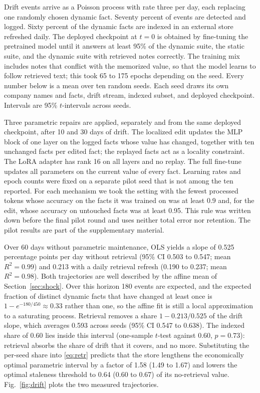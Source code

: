 \documentclass[journal]{IEEEtran}
\begin{document}
Drift events arrive as a Poisson process with rate three per day, each replacing one randomly chosen dynamic fact. Seventy percent of events are detected and logged. Sixty percent of the dynamic facts are indexed in an external store refreshed daily. The deployed checkpoint at $t=0$ is obtained by fine-tuning the pretrained model until it answers at least 95\% of the dynamic suite, the static suite, and the dynamic suite with retrieved notes correctly. The training mix includes notes that conflict with the memorized value, so that the model learns to follow retrieved text; this took 65 to 175 epochs depending on the seed. Every number below is a mean over ten random seeds. Each seed draws its own company names and facts, drift stream, indexed subset, and deployed checkpoint. Intervals are 95\% $t$-intervals across seeds.

Three parametric repairs are applied, separately and from the same deployed checkpoint, after 10 and 30 days of drift. The localized edit updates the MLP block of one layer on the logged facts whose value has changed, together with ten unchanged facts per edited fact; the replayed facts act as a locality constraint. The LoRA adapter \cite{hu2022} has rank 16 on all layers and no replay. The full fine-tune updates all parameters on the current value of every fact. Learning rates and epoch counts were fixed on a separate pilot seed that is not among the ten reported. For each mechanism we took the setting with the fewest processed tokens whose accuracy on the facts it was trained on was at least 0.9 and, for the edit, whose accuracy on untouched facts was at least 0.95. This rule was written down before the final pilot round and uses neither total error nor retention. The pilot results are part of the supplementary material.

Over 60 days without parametric maintenance, OLS yields a slope of 0.525 percentage points per day without retrieval (95\% CI 0.503 to 0.547; mean $R^2=0.99$) and 0.213 with a daily retrieval refresh (0.190 to 0.237; mean $R^2=0.98$). Both trajectories are well described by the affine mean of Section~\ref{sec:shock}. Over this horizon 180 events are expected, and the expected fraction of distinct dynamic facts that have changed at least once is $1-e^{-180/450}\approx0.33$ rather than one, so the affine fit is still a local approximation to a saturating process. Retrieval removes a share $1-0.213/0.525$ of the drift slope, which averages 0.593 across seeds (95\% CI 0.547 to 0.638). The indexed share of 0.60 lies inside this interval (one-sample $t$-test against 0.60, $p=0.73$): retrieval absorbs the share of drift that it covers, and no more. Substituting the per-seed share into \eqref{eq:retr} predicts that the store lengthens the economically optimal parametric interval by a factor of 1.58 (1.49 to 1.67) and lowers the optimal staleness threshold to 0.64 (0.60 to 0.67) of its no-retrieval value. Fig.~\ref{fig:drift} plots the two measured trajectories.
\end{document}
